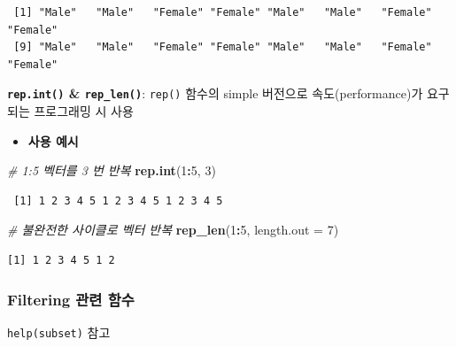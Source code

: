 \documentclass[
  11pt,
]{krantz}
\makeatletter
\newenvironment{Shaded}{\begin{snugshade}}{\end{snugshade}}
\newcommand{\CommentTok}[1]{\textcolor[rgb]{0.37,0.37,0.37}{\textit{#1}}}
\newcommand{\DataTypeTok}[1]{\textcolor[rgb]{0.27,0.27,0.27}{#1}}
\newcommand{\DecValTok}[1]{\textcolor[rgb]{0.06,0.06,0.06}{#1}}
\newcommand{\KeywordTok}[1]{\textcolor[rgb]{0.27,0.27,0.27}{\textbf{#1}}}
\newcommand{\NormalTok}[1]{#1}
\newcommand{\OperatorTok}[1]{\textcolor[rgb]{0.43,0.43,0.43}{\textbf{#1}}}
\providecommand{\tightlist}{%
  \setlength{\itemsep}{0pt}\setlength{\parskip}{0pt}}
\newenvironment{kframe}{%
\medskip{}
\setlength{\fboxsep}{.8em}
 \def\at@end@of@kframe{}%
 \ifinner\ifhmode%
  \def\at@end@of@kframe{\end{minipage}}%
  \begin{minipage}{\columnwidth}%
 \fi\fi%
 \def\FrameCommand##1{\hskip\@totalleftmargin \hskip-\fboxsep
 \colorbox{shadecolor}{##1}\hskip-\fboxsep
     \hskip-\linewidth \hskip-\@totalleftmargin \hskip\columnwidth}%
 \MakeFramed {\advance\hsize-\width
   \@totalleftmargin\z@ \linewidth\hsize
   \@setminipage}}%
 {\par\unskip\endMakeFramed%
 \at@end@of@kframe}
\renewenvironment{quote}{\begin{kframe}}{\end{kframe}}
\makeatother
\begin{document}
\begin{verbatim}
 [1] "Male"   "Male"   "Female" "Female" "Male"   "Male"   "Female" "Female"
 [9] "Male"   "Male"   "Female" "Female" "Male"   "Male"   "Female" "Female"
\end{verbatim}

\normalsize

\textbf{\texttt{rep.int()} \& \texttt{rep\_len()}}: \texttt{rep()} 함수의 simple 버전으로 속도(performance)가 요구되는 프로그래밍 시 사용

\begin{itemize}
\tightlist
\item
  \textbf{사용 예시}
\end{itemize}

\footnotesize

\begin{Shaded}
\begin{Highlighting}[]
\CommentTok{# 1:5 벡터를 3 번 반복}
\KeywordTok{rep.int}\NormalTok{(}\DecValTok{1}\OperatorTok{:}\DecValTok{5}\NormalTok{, }\DecValTok{3}\NormalTok{)}
\end{Highlighting}
\end{Shaded}

\begin{verbatim}
 [1] 1 2 3 4 5 1 2 3 4 5 1 2 3 4 5
\end{verbatim}

\begin{Shaded}
\begin{Highlighting}[]
\CommentTok{# 불완전한 사이클로 벡터 반복}
\KeywordTok{rep_len}\NormalTok{(}\DecValTok{1}\OperatorTok{:}\DecValTok{5}\NormalTok{, }\DataTypeTok{length.out =} \DecValTok{7}\NormalTok{)}
\end{Highlighting}
\end{Shaded}

\begin{verbatim}
[1] 1 2 3 4 5 1 2
\end{verbatim}

\normalsize

\hypertarget{fun-filtering}{%
\subsubsection*{\texorpdfstring{\textbf{Filtering 관련 함수}}{Filtering 관련 함수}}\label{fun-filtering}}


\begin{quote}
\texttt{help(subset)} 참고
\end{quote}
\end{document}

